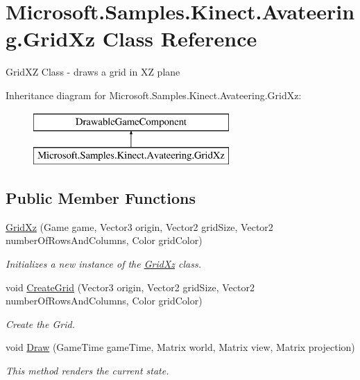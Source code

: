\hypertarget{class_microsoft_1_1_samples_1_1_kinect_1_1_avateering_1_1_grid_xz}{\section{Microsoft.\+Samples.\+Kinect.\+Avateering.\+Grid\+Xz Class Reference}
\label{class_microsoft_1_1_samples_1_1_kinect_1_1_avateering_1_1_grid_xz}
}


Grid\+X\+Z Class -\/ draws a grid in X\+Z plane  


Inheritance diagram for Microsoft.\+Samples.\+Kinect.\+Avateering.\+Grid\+Xz\+:\begin{figure}[H]
\begin{center}
\leavevmode
\includegraphics[height=2.000000cm]{class_microsoft_1_1_samples_1_1_kinect_1_1_avateering_1_1_grid_xz}
\end{center}
\end{figure}
\subsection*{Public Member Functions}
\begin{DoxyCompactItemize}
\item 
\hyperlink{class_microsoft_1_1_samples_1_1_kinect_1_1_avateering_1_1_grid_xz_ac09b225053a47086ce0b346959f7daf9}{Grid\+Xz} (Game game, Vector3 origin, Vector2 grid\+Size, Vector2 number\+Of\+Rows\+And\+Columns, Color grid\+Color)
\begin{DoxyCompactList}\small\item\em Initializes a new instance of the \hyperlink{class_microsoft_1_1_samples_1_1_kinect_1_1_avateering_1_1_grid_xz}{Grid\+Xz} class. \end{DoxyCompactList}\item 
void \hyperlink{class_microsoft_1_1_samples_1_1_kinect_1_1_avateering_1_1_grid_xz_a19e9796b69d18b7c244d027c99e3828c}{Create\+Grid} (Vector3 origin, Vector2 grid\+Size, Vector2 number\+Of\+Rows\+And\+Columns, Color grid\+Color)
\begin{DoxyCompactList}\small\item\em Create the Grid. \end{DoxyCompactList}\item 
void \hyperlink{class_microsoft_1_1_samples_1_1_kinect_1_1_avateering_1_1_grid_xz_add707450b8720901a9470c71d0848fee}{Draw} (Game\+Time game\+Time, Matrix world, Matrix view, Matrix projection)
\begin{DoxyCompactList}\small\item\em This method renders the current state. \end{DoxyCompactList}\end{DoxyCompactItemize}
